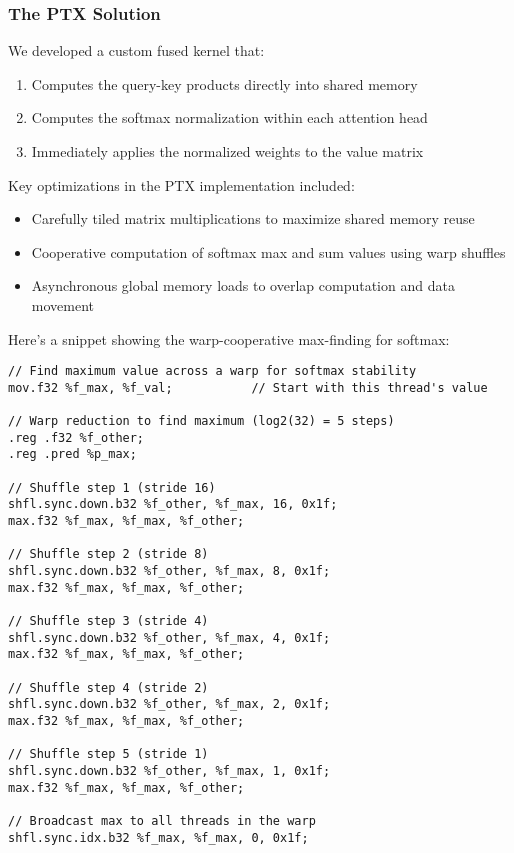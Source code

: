 \subsubsection{The PTX Solution}

We developed a custom fused kernel that:
\begin{enumerate}
    \item Computes the query-key products directly into shared memory
    \item Computes the softmax normalization within each attention head
    \item Immediately applies the normalized weights to the value matrix
\end{enumerate}

Key optimizations in the PTX implementation included:
\begin{itemize}
    \item Carefully tiled matrix multiplications to maximize shared memory reuse
    \item Cooperative computation of softmax max and sum values using warp shuffles
    \item Asynchronous global memory loads to overlap computation and data movement
\end{itemize}

Here's a snippet showing the warp-cooperative max-finding for softmax:

\begin{lstlisting}[style=ptx]
// Find maximum value across a warp for softmax stability
mov.f32 %f_max, %f_val;           // Start with this thread's value

// Warp reduction to find maximum (log2(32) = 5 steps)
.reg .f32 %f_other;
.reg .pred %p_max;

// Shuffle step 1 (stride 16)
shfl.sync.down.b32 %f_other, %f_max, 16, 0x1f;
max.f32 %f_max, %f_max, %f_other;

// Shuffle step 2 (stride 8)
shfl.sync.down.b32 %f_other, %f_max, 8, 0x1f;
max.f32 %f_max, %f_max, %f_other;

// Shuffle step 3 (stride 4)
shfl.sync.down.b32 %f_other, %f_max, 4, 0x1f;
max.f32 %f_max, %f_max, %f_other;

// Shuffle step 4 (stride 2)
shfl.sync.down.b32 %f_other, %f_max, 2, 0x1f;
max.f32 %f_max, %f_max, %f_other;

// Shuffle step 5 (stride 1)
shfl.sync.down.b32 %f_other, %f_max, 1, 0x1f;
max.f32 %f_max, %f_max, %f_other;

// Broadcast max to all threads in the warp
shfl.sync.idx.b32 %f_max, %f_max, 0, 0x1f;
\end{lstlisting}


